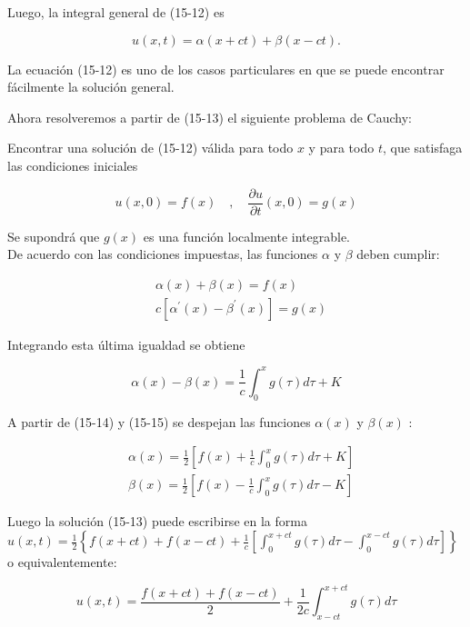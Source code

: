 \documentclass[10pt]{article}
\theoremstyle{plain}
\theoremstyle{definition}
\theoremstyle{remark}
\begin{document}
Luego, la integral general de (15-12) es


\begin{equation*}
u(x, t)=\alpha(x+c t)+\beta(x-c t) . \tag{15-13}
\end{equation*}


La ecuación (15-12) es uno de los casos particulares en que se puede encontrar fácilmente la solución general.

Ahora resolveremos a partir de (15-13) el siguiente problema de Cauchy:

Encontrar una solución de (15-12) válida para todo $x$ y para todo $t$, que satisfaga las condiciones iniciales

$$
u(x, 0)=f(x) \quad, \quad \frac{\partial u}{\partial t}(x, 0)=g(x)
$$

Se supondrá que $g(x)$ es una función localmente integrable.\\
De acuerdo con las condiciones impuestas, las funciones $\alpha$ y $\beta$ deben cumplir:


\begin{align*}
& \alpha(x)+\beta(x)=f(x) \\
& c\left[\alpha^{\prime}(x)-\beta^{\prime}(x)\right]=g(x) \tag{15-14}
\end{align*}


Integrando esta última igualdad se obtiene


\begin{equation*}
\alpha(x)-\beta(x)=\frac{1}{c} \int_{0}^{x} g(\tau) d \tau+K \tag{15-15}
\end{equation*}


A partir de (15-14) y (15-15) se despejan las funciones $\alpha(x)$ y $\beta(x)$ :

$$
\begin{aligned}
& \alpha(x)=\frac{1}{2}\left[f(x)+\frac{1}{c} \int_{0}^{x} g(\tau) d \tau+K\right] \\
& \beta(x)=\frac{1}{2}\left[f(x)-\frac{1}{c} \int_{0}^{x} g(\tau) d \tau-K\right]
\end{aligned}
$$

Luego la solución (15-13) puede escribirse en la forma $u(x, t)=\frac{1}{2}\left\{f(x+c t)+f(x-c t)+\frac{1}{c}\left[\int_{0}^{x+c t} g(\tau) d \tau-\int_{0}^{x-c t} g(\tau) d \tau\right]\right\}$ o equivalentemente:


\begin{equation*}
u(x, t)=\frac{f(x+c t)+f(x-c t)}{2}+\frac{1}{2 c} \int_{x-c t}^{x+c t} g(\tau) d \tau \tag{15-16}
\end{equation*}
\end{document}
